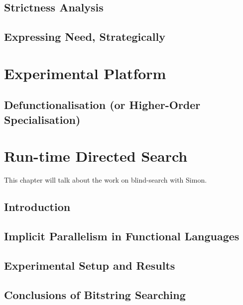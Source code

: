 \documentclass[justified, twoside, a4paper, symmetric]{tufte-book}
\begin{document}
    

    \section{Strictness Analysis}
    

    \section{Expressing Need, Strategically}
    
    
\chapter{Experimental Platform}

    \section{Defunctionalisation (or Higher-Order Specialisation)}
    

\chapter{Run-time Directed Search}

    This chapter will talk about the work on blind-search with Simon.

    \section{Introduction}
    

    \section{Implicit Parallelism in Functional Languages}
    \label{sec:blind-ParFunc}
    

    \section{Experimental Setup and Results}
    \label{sec:blind-Results}
    

    \section{Conclusions of Bitstring Searching}
    \label{sec:blind-Conclusion}
    
\end{document}
